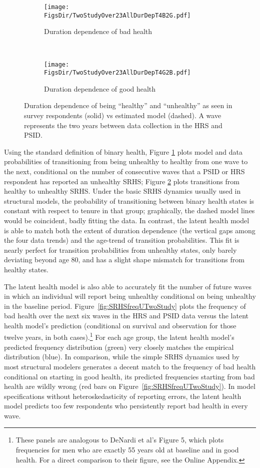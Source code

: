 \documentclass[12pt,pdftex,letterpaper]{article}
\newcommand{\RootDir}{..}
\newcommand{\FigsDir}{\RootDir/Figures}
\begin{document}
\begin{figure}
	\centering
	\begin{subfigure}[b]{0.48\textwidth}
		\texttt{[image: \\FigsDir/TwoStudyOver23AllDurDepT4B2G.pdf]}
		\caption{Duration dependence of bad health}\label{fig:DurDepTwoStudyAllB2G}
	\end{subfigure}
	~
	\begin{subfigure}[b]{0.48\textwidth}
		\texttt{[image: \\FigsDir/TwoStudyOver23AllDurDepT4G2B.pdf]}
		\caption{Duration dependence of good health}\label{fig:DurDepTwoStudyAllG2B}
	\end{subfigure}
	\caption{Duration dependence of being ``healthy'' and ``unhealthy'' as seen in survey respondents (solid) vs estimated model (dashed).  A wave represents the two years between data collection in the HRS and PSID.}\label{fig:DurDepTwoStudyAll}
\end{figure}

Using the standard definition of binary health, Figure \ref{fig:DurDepTwoStudyAllB2G} plots model and data probabilities of transitioning from being unhealthy to healthy from one wave to the next, conditional on the number of consecutive waves that a PSID or HRS respondent has reported an unhealthy SRHS; Figure \ref{fig:DurDepTwoStudyAllG2B} plots transitions from healthy to unhealthy SRHS.  Under the basic SRHS dynamics usually used in structural models, the probability of transitioning between binary health states is constant with respect to tenure in that group; graphically, the dashed model lines would be coincident, badly fitting the data. In contrast, the latent health model is able to match both the extent of duration dependence (the vertical gaps among the four data trends) and the age-trend of transition probabilities. This fit is nearly perfect for transition probabilities from unhealthy states, only barely deviating beyond age 80, and has a slight shape mismatch for transitions from healthy states.

The latent health model is also able to accurately fit the number of future waves in which an individual will report being unhealthy conditional on being unhealthy in the baseline period. Figure~\ref{fig:SRHSfreqUTwoStudy} plots the frequency of bad health over the next six waves in the HRS and PSID data versus the latent health model's prediction (conditional on survival and observation for those twelve years, in both cases).\footnote{These panels are analogous to DeNardi et al's Figure 5, which plots frequencies for men who are exactly 55 years old at baseline and in good health. For a direct comparison to their figure, see the Online Appendix.} For each age group, the latent health model's predicted frequency distribution (green) very closely matches the empirical distribution (blue). In comparison, while the simple SRHS dynamics used by most structural modelers generates a decent match to the frequency of bad health conditional on starting in good health, its predicted frequencies starting from bad health are wildly wrong (red bars on Figure~\ref{fig:SRHSfreqUTwoStudy}). In model specifications without heteroskedasticity of reporting errors, the latent health model predicts too few respondents who persistently report bad health in every wave.
\end{document}
